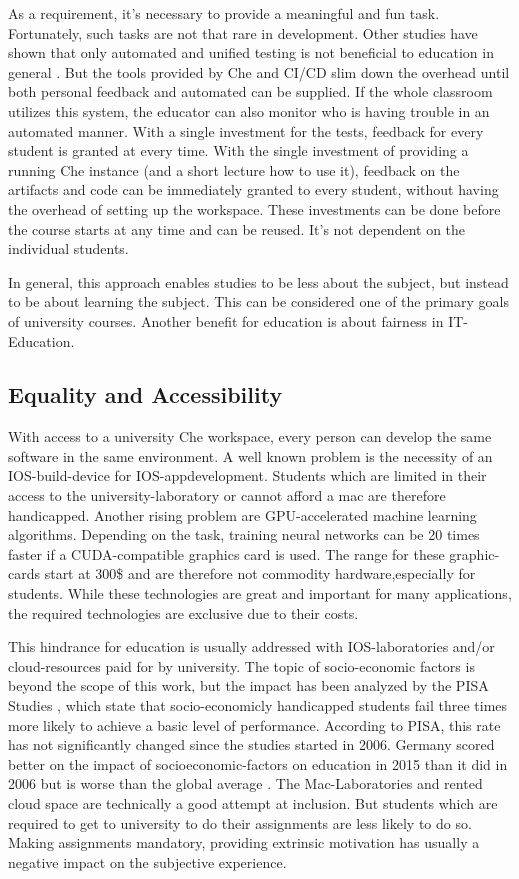 \documentclass[utf8]{lni}
\begin{document}
As a requirement, it's necessary to provide a meaningful and fun task. 
Fortunately, such tasks are not that rare in development.  
Other studies have shown that only automated and unified testing is not beneficial to education in general \cite{TC88}. 
But the tools provided by Che and CI/CD slim down the overhead until both personal feedback and automated can be supplied. 
If the whole classroom utilizes this system, the educator can also monitor who is having trouble in an automated manner. 
With a single investment for the tests, feedback for every student is granted at every time. 
With the single investment of providing a running Che instance (and a short lecture how to use it), feedback on the artifacts and code can be immediately granted to every student, without having the overhead of setting up the workspace. 
These investments can be done before the course starts at any time and can be reused.
It's not dependent on the individual students. 

In general, this approach enables studies to be less about the subject, but instead to be about learning the subject. 
This can be considered one of the primary goals of university courses. 
Another benefit for education is about fairness in IT-Education.  

\subsection{Equality and Accessibility}
With access to a university Che workspace, every person can develop the same software in the same environment. 
A well known problem is the necessity of an IOS-build-device for IOS-appdevelopment.
Students which are limited in their access to the university-laboratory or cannot afford a mac are therefore handicapped.
Another  rising  problem  are  GPU-accelerated  machine learning algorithms. 
Depending on the task, training neural networks can be 20 times faster if a CUDA-compatible graphics card is used. 
The range for these graphic-cards start at 300\$ and are therefore not commodity hardware,especially for students.  
While these technologies are great and important for many applications, the required technologies are exclusive due to  their  costs.

This  hindrance  for  education  is  usually addressed  with  IOS-laboratories  and/or  cloud-resources paid for by university. 
The topic of socio-economic factors is beyond the scope of this work, but the impact has been analyzed by the PISA Studies \cite{PISA15}, which state that socio-economicly handicapped students fail three times more likely to achieve a basic level of performance.
According to PISA, this rate has not significantly changed since the studies started in 2006. 
Germany scored better on the impact of socioeconomic-factors on education in 2015 than it did in 2006 but is worse than the global average \cite{OECDCN15}.
The Mac-Laboratories and rented cloud space are technically a good attempt at inclusion. 
But students which are required to get to university to do their assignments are 
less  likely  to  do  so.
Making  assignments  mandatory, providing extrinsic motivation \cite{DECI93} has usually a negative impact on the subjective experience.
\end{document}
